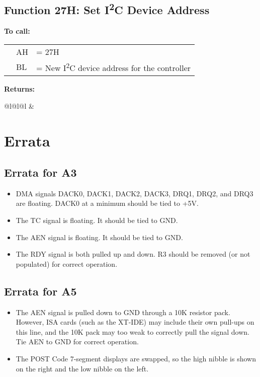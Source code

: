 \documentclass[twoside,10pt,letterpaper]{refart}
\newcommand{\itwoc}{I\textsuperscript{2}C}
\begin{document}
\subsection{Function 27H: Set \itwoc{} Device Address}
\textbf{To call:}

\begin{tabular}{@{\hspace{2em}}l@{}l@{\hspace{2em}}l}
{} & AH & = 27H \\
{} & BL & = New \itwoc{} device address for the controller
\end{tabular}

\textbf{Returns:}

\begin{tabular}{@{\hspace{2em}}l@{}l@{\hspace{2em}}l}
{} & 
\end{tabular}

\newpage

\section{Errata}

\subsection{Errata for A3}
\begin{itemize}
    \item DMA signals DACK0, DACK1, DACK2, DACK3, DRQ1, DRQ2, and DRQ3 are floating. DACK0 at a minimum should be tied to +5V.
    \item The TC signal is floating. It should be tied to GND.
    \item The AEN signal is floating. It should be tied to GND.
    \item The RDY signal is both pulled up and down. R3 should be removed (or not populated) for correct operation.
\end{itemize}

\subsection{Errata for A5}
\begin{itemize}
    \item The AEN signal is pulled down to GND through a 10K resistor pack. However, ISA cards (such as the XT-IDE) may include their own pull-ups on this line, and the 10K pack may too weak to correctly pull the signal down. Tie AEN to GND for correct operation.
    \item The POST Code 7-segment displays are swapped, so the high nibble is shown on the right and the low nibble on the left.
\end{itemize}
\end{document}

